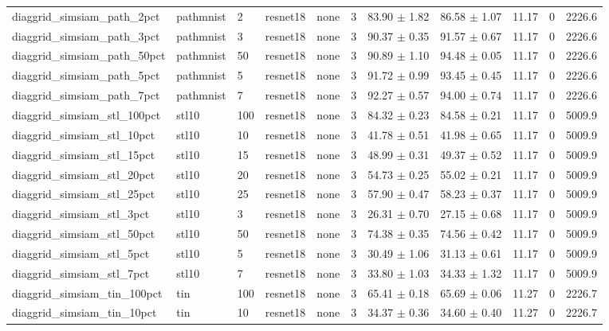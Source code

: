 \begin{tabular}{lllllllllll}
diaggrid_simsiam_path_2pct & pathmnist & 2 & resnet18 & none & 3 & 83.90 $\pm$ 1.82 & 86.58 $\pm$ 1.07 & 11.17 & 0 & 2226.6 \\
diaggrid_simsiam_path_3pct & pathmnist & 3 & resnet18 & none & 3 & 90.37 $\pm$ 0.35 & 91.57 $\pm$ 0.67 & 11.17 & 0 & 2226.6 \\
diaggrid_simsiam_path_50pct & pathmnist & 50 & resnet18 & none & 3 & 90.89 $\pm$ 1.10 & 94.48 $\pm$ 0.05 & 11.17 & 0 & 2226.6 \\
diaggrid_simsiam_path_5pct & pathmnist & 5 & resnet18 & none & 3 & 91.72 $\pm$ 0.99 & 93.45 $\pm$ 0.45 & 11.17 & 0 & 2226.6 \\
diaggrid_simsiam_path_7pct & pathmnist & 7 & resnet18 & none & 3 & 92.27 $\pm$ 0.57 & 94.00 $\pm$ 0.74 & 11.17 & 0 & 2226.6 \\
diaggrid_simsiam_stl_100pct & stl10 & 100 & resnet18 & none & 3 & 84.32 $\pm$ 0.23 & 84.58 $\pm$ 0.21 & 11.17 & 0 & 5009.9 \\
diaggrid_simsiam_stl_10pct & stl10 & 10 & resnet18 & none & 3 & 41.78 $\pm$ 0.51 & 41.98 $\pm$ 0.65 & 11.17 & 0 & 5009.9 \\
diaggrid_simsiam_stl_15pct & stl10 & 15 & resnet18 & none & 3 & 48.99 $\pm$ 0.31 & 49.37 $\pm$ 0.52 & 11.17 & 0 & 5009.9 \\
diaggrid_simsiam_stl_20pct & stl10 & 20 & resnet18 & none & 3 & 54.73 $\pm$ 0.25 & 55.02 $\pm$ 0.21 & 11.17 & 0 & 5009.9 \\
diaggrid_simsiam_stl_25pct & stl10 & 25 & resnet18 & none & 3 & 57.90 $\pm$ 0.47 & 58.23 $\pm$ 0.37 & 11.17 & 0 & 5009.9 \\
diaggrid_simsiam_stl_3pct & stl10 & 3 & resnet18 & none & 3 & 26.31 $\pm$ 0.70 & 27.15 $\pm$ 0.68 & 11.17 & 0 & 5009.9 \\
diaggrid_simsiam_stl_50pct & stl10 & 50 & resnet18 & none & 3 & 74.38 $\pm$ 0.35 & 74.56 $\pm$ 0.42 & 11.17 & 0 & 5009.9 \\
diaggrid_simsiam_stl_5pct & stl10 & 5 & resnet18 & none & 3 & 30.49 $\pm$ 1.06 & 31.13 $\pm$ 0.61 & 11.17 & 0 & 5009.9 \\
diaggrid_simsiam_stl_7pct & stl10 & 7 & resnet18 & none & 3 & 33.80 $\pm$ 1.03 & 34.33 $\pm$ 1.32 & 11.17 & 0 & 5009.9 \\
diaggrid_simsiam_tin_100pct & tin & 100 & resnet18 & none & 3 & 65.41 $\pm$ 0.18 & 65.69 $\pm$ 0.06 & 11.27 & 0 & 2226.7 \\
diaggrid_simsiam_tin_10pct & tin & 10 & resnet18 & none & 3 & 34.37 $\pm$ 0.36 & 34.60 $\pm$ 0.40 & 11.27 & 0 & 2226.7 \\

\end{tabular}
